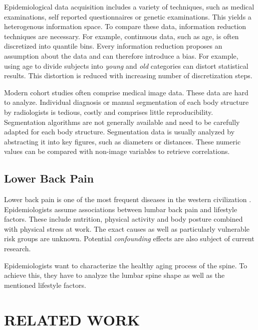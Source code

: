 \documentclass[a4paper,twoside]{style/article}
\begin{document}
Epidemiological data acquisition includes a variety of techniques, such as medical examinations, self reported questionnaires or genetic examinations.
This yields a heterogenous information space.
To compare these data, information reduction techniques are necessary.
For example, continuous data, such as age, is often discretized into quantile bins.
Every information reduction proposes an assumption about the data and can therefore introduce a bias.
For example, using age to divide subjects into \emph{young} and \emph{old} categories can distort statistical results.
This distortion is reduced with increasing number of discretization steps.

Modern cohort studies often comprise medical image data.
These data are hard to analyze.
Individual diagnosis or manual segmentation of each body structure by radiologists is tedious, costly and comprises little reproducibility.
Segmentation algorithms are not generally available and need to be carefully adapted for each body structure.
Segmentation data is usually analyzed by abstracting it into key figures, such as diameters or distances.
These numeric values can be compared with non-image variables to retrieve correlations.
\subsection{Lower Back Pain}
Lower back pain is one of the most frequent diseases in the western civilization \cite{Hoy2010}.
Epidemiologists assume associations between lumbar back pain and lifestyle factors.
These include nutrition, physical activity and body posture combined with physical stress at work.
The exact causes as well as particularly vulnerable risk groups are unknown.
Potential \emph{confounding} effects are also subject of current research.

Epidemiologists want to characterize the healthy aging process of the spine.
To achieve this, they have to analyze the lumbar spine shape as well as the mentioned lifestyle factors.
\section{\uppercase{Related Work}}
\label{sec:RelatedWork}
\end{document}
